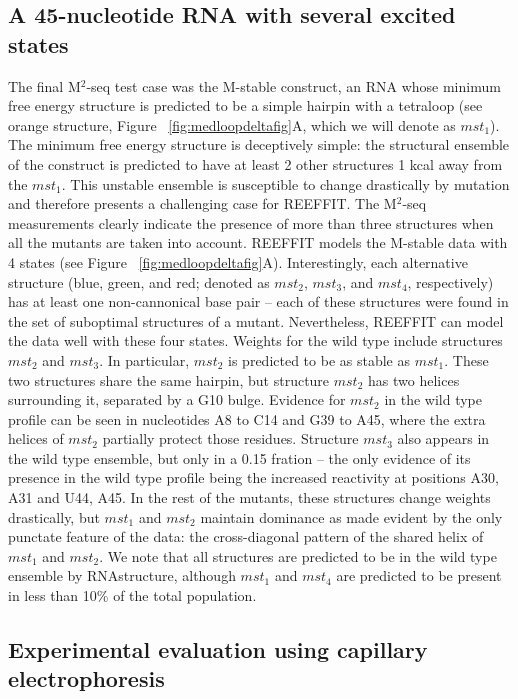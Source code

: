 \documentclass[12pt]{article}
\begin{document}
\subsection{A 45-nucleotide RNA with several excited states}

The final M$^2$-seq test case was the M-stable construct, an RNA whose minimum free energy structure is predicted to be a simple hairpin with a tetraloop (see orange structure, Figure  ~\ref{fig:medloopdeltafig}A, which we will denote as $mst_1$). 
The minimum free energy structure is deceptively simple: the structural ensemble of the construct is predicted to have at least 2 other structures 1 kcal away from the $mst_1$. 
This unstable ensemble is susceptible to change drastically by mutation and therefore presents a challenging case for REEFFIT. 
The M$^2$-seq measurements clearly indicate the presence of more than three structures when all the mutants are taken into account. 
REEFFIT models the M-stable data with 4 states (see Figure ~\ref{fig:medloopdeltafig}A). 
Interestingly, each alternative structure (blue, green, and red; denoted as $mst_2$, $mst_3$, and $mst_4$, respectively) has at least one non-cannonical base pair -- each of these structures were found in the set of suboptimal structures of a mutant. 
Nevertheless, REEFFIT can model the data well with these four states. Weights for the wild type include structures $mst_2$ and $mst_3$. 
In particular, $mst_2$ is predicted to be as stable as $mst_1$. 
These two structures share the same hairpin, but structure $mst_2$ has two helices surrounding it, separated by a G10 bulge. 
Evidence for $mst_2$ in the wild type profile can be seen in nucleotides A8 to C14 and G39 to A45, where the extra helices of $mst_2$ partially protect those residues. 
Structure $mst_3$ also appears in the wild type ensemble, but only in a 0.15 fration -- the only evidence of its presence in the wild type profile being the increased reactivity at positions A30, A31 and U44, A45. 
In the rest of the mutants, these structures change weights drastically, but $mst_1$ and $mst_2$ maintain dominance as made evident by the only punctate feature of the data: the cross-diagonal pattern of the shared helix of $mst_1$ and $mst_2$.
We note that all structures are predicted to be in the wild type ensemble by RNAstructure, although $mst_1$ and $mst_4$ are predicted to be present in less than 10\% of the total population.


\subsection{Experimental evaluation using capillary electrophoresis}
\end{document}
